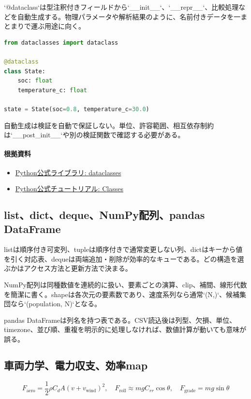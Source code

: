 \documentclass[a4paper,11pt]{article}
\begin{document}
`@dataclass`は型注釈付きフィールドから`\_\_init\_\_`、`\_\_repr\_\_`、比較処理などを自動生成する。物理パラメータや解析結果のように、名前付きデータを一まとまりで運ぶ用途に向く。


\begin{lstlisting}[language=python]
from dataclasses import dataclass

@dataclass
class State:
    soc: float
    temperature_c: float

state = State(soc=0.8, temperature_c=30.0)
\end{lstlisting}


自動生成は検証を自動で保証しない。単位、許容範囲、相互依存制約は`\_\_post\_init\_\_`や別の検証関数で確認する必要がある。

\paragraph{根拠資料}
\begin{itemize}[leftmargin=1.6em]
\item \href{https://docs.python.org/3/library/dataclasses.html}{Python公式ライブラリ: dataclasses}
\item \href{https://docs.python.org/3/tutorial/classes.html}{Python公式チュートリアル: Classes}
\end{itemize}

\subsection{list、dict、deque、NumPy配列、pandas DataFrame}
listは順序付き可変列、tupleは順序付きで通常変更しない列、dictはキーから値を引く対応表、dequeは両端追加・削除が効率的なキューである。どの構造を選ぶかはアクセス方法と更新方法で決まる。


NumPy配列は同種数値を連続的に扱い、要素ごとの演算、clip、補間、線形代数を簡潔に書く。shapeは各次元の要素数であり、速度系列なら通常`(N,)`、候補集団なら`(population, N)`となる。


pandas DataFrameは列名を持つ表である。CSV読込後は列型、欠損、単位、timezone、並び順、重複を明示的に処理しなければ、数値計算が動いても意味が誤る。



\subsection{車両力学、電力収支、効率map}
\[
F_{\mathrm{aero}}=\frac{1}{2}\rho C_dA(v+v_{\mathrm{wind}})^2,\quad F_{\mathrm{roll}}\approx mgC_{rr}\cos\theta,\quad F_{\mathrm{grade}}=mg\sin\theta
\]
\end{document}
